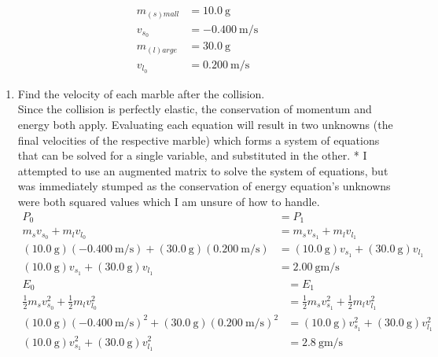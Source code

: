 \documentclass{article}
\begin{document}
\begin{align*}
	m_{(s)mall} & = \SI{10.0}{\gram} \\
	v_{s_0} & = \SI{-0.400}{\meter \per \second} \\
	m_{(l)arge} & = \SI{30.0}{\gram} \\
	v_{l_0} & = \SI{0.200}{\meter \per \second}
\end{align*}
\begin{enumerate}[label = \textbf{(\alph*)}]
	\item Find the velocity of each marble after the collision. \\
		Since the collision is perfectly elastic, the conservation of momentum and energy both apply. Evaluating each equation will result in two unknowns (the final velocities of the respective marble) which forms a system of equations that can be solved for a single variable, and substituted in the other. * I attempted to use an augmented matrix to solve the system of equations, but was immediately stumped as the conservation of energy equation's unknowns were both squared values which I am unsure of how to handle.
		\begin{align*}
			P_0 & = P_1 \\
			m_sv_{s_0} + m_lv_{l_0} & = m_sv_{s_1} + m_lv_{l_1} \\
			(\SI{10.0}{\gram})(\SI{-0.400}{\meter \per \second}) + (\SI{30.0}{\gram})(\SI{0.200}{\meter \per \second}) & = (\SI{10.0}{\gram})v_{s_1} + (\SI{30.0}{\gram})v_{l_1} \\
			(\SI{10.0}{\gram})v_{s_1} + (\SI{30.0}{\gram})v_{l_1} & = \SI{2.00}{\gram \meter \per \second}
		\end{align*}
		\begin{align*}
			E_0 & = E_1 \\
			\frac{1}{2}m_sv_{s_0}^2 + \frac{1}{2}m_lv_{l_0}^2 & = \frac{1}{2}m_sv_{s_1}^2 + \frac{1}{2}m_lv_{l_1}^2 \\
			(\SI{10.0}{\gram})(\SI{-0.400}{\meter \per \second})^2 + (\SI{30.0}{\gram})(\SI{0.200}{\meter \per \second})^2 & = (\SI{10.0}{\gram})v_{s_1}^2 + (\SI{30.0}{\gram})v_{l_1}^2 \\
			(\SI{10.0}{\gram})v_{s_1}^2 + (\SI{30.0}{\gram})v_{l_1}^2 & = \SI{2.8}{\gram \meter \per \second}

\end{align*}
\end{enumerate}
\end{document}
